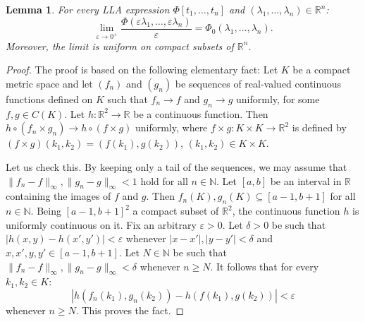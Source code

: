 \documentclass{memo-l}
\newtheorem{lem}[theorem]{Lemma}
\theoremstyle{definition}
\theoremstyle{remark}
\numberwithin{section}{chapter}
\numberwithin{equation}{chapter}
\newcommand\N{\ensuremath{\mathbb{N}}}
\newcommand\R{\ensuremath{\mathbb{R}}}
\begin{document}
\begin{lem}\label{lem:lla_limit}
    For every LLA expression $\Phi [t_1,\ldots ,t_n]$ and $(\lambda
    _1,\ldots ,\lambda _n) \in \R^{n}$:
    \[
    \lim_{\varepsilon  \to 0^{+}}\frac{\Phi (\varepsilon \lambda
    _1,\ldots ,\varepsilon \lambda _n)}{\varepsilon }=\Phi _0 (\lambda
    _1,\ldots ,\lambda _n).
    \]
    Moreover, the limit is uniform on compact subsets of $\R^{n}$.
\end{lem}
\begin{proof}
    The proof is based on the following elementary fact:
    Let $K$ be a compact metric space and let $(f_n)$ and $(g_n)$ be
    sequences of real-valued continuous functions defined on $K$ such
    that $f_n\to f$ and $g_n\to g$ uniformly, for some $f,g \in C(K)$.
    Let $h\colon \R^2\to \R$ be a continuous function. Then $h\circ
    (f_n\times g_n)\to h\circ (f\times g)$ uniformly, where $f\times g
    \colon K\times K\to \R^2$ is defined by $(f\times
    g)(k_1,k_2)=(f(k_1),g(k_2))$, $(k_1,k_2)\in K\times K$.

    Let us check this. By keeping only a tail of the sequences, we may
    assume that $\|f_n-f\|_\infty, \|g_n-g\|_{\infty
    }<1$ hold for all $n \in \N$. Let $[a,b]$ be an interval in
    $\R$ containing the images of $f$ and $g$. Then
    $f_n(K),g_n(K)\subseteq [a-1,b+1]$ for all
    $n \in \N$. Being $[a-1,b+1 ]^2$ a compact
    subset of $\R^2$, the continuous function $h$ is uniformly
    continuous on it.
    Fix an arbitrary $\varepsilon >0$.
    Let $\delta >0$ be such that $|h(x,y)-h(x',y')|<\varepsilon $
    whenever $|x-x'|,|y-y'|<\delta $ and $x,x',y,y' \in [a-1,b+1]$.
    Let $N \in \N$ be such that $\|f_n-f\|_\infty, \|g_n-g\|_{\infty
    }<\delta $ whenever $n\ge N$. It follows that for every $k_1,k_2 \in K$:
    \[
        |h(f_n(k_1),g_n(k_2))-h(f(k_1),g(k_2))|<\varepsilon
    \]
    whenever $n\ge N$. This proves the fact.


\end{proof}
\end{document}
